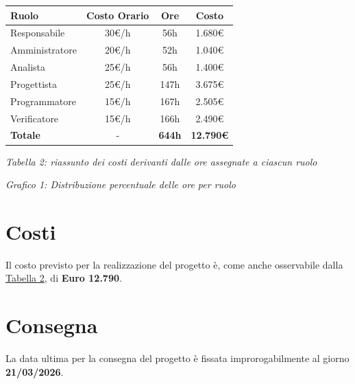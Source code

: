 \documentclass[a4paper,11pt]{article}
\begin{document}
{\footnotesize
\begin{center}
\label{tab:costi-ruoli}
\begin{tabular}{|l|c|c|c|}
\hline
\textbf{Ruolo} & \textbf{Costo Orario} & \textbf{Ore} & \textbf{Costo} \\
\hline
Responsabile & 30€/h & 56h & 1.680€ \\
Amministratore & 20€/h & 52h & 1.040€ \\
Analista & 25€/h & 56h & 1.400€ \\
Progettista & 25€/h & 147h & 3.675€ \\
Programmatore & 15€/h & 167h & 2.505€ \\
Verificatore & 15€/h & 166h & 2.490€ \\
\hline
\textbf{Totale} & - & \textbf{644h} & \textbf{12.790€} \\
\hline
\end{tabular}
\end{center}
}

\begin{center}
\textit{Tabella 2: riassunto dei costi derivanti dalle ore assegnate a ciascun ruolo}
\end{center}

\vspace{1cm}

\begin{center}
\end{center}

\begin{center}
\textit{Grafico 1: Distribuzione percentuale delle ore per ruolo}
\end{center}

\newpage

\section{Costi}
Il costo previsto per la realizzazione del progetto è, come anche osservabile dalla \hyperref[tab:costi-ruoli]{\textcolor{secondaryblue}{Tabella 2}}, di \textbf{Euro 12.790}.

\section{Consegna}
La data ultima per la consegna del progetto è fissata improrogabilmente al giorno \textbf{21/03/2026}.
\end{document}
